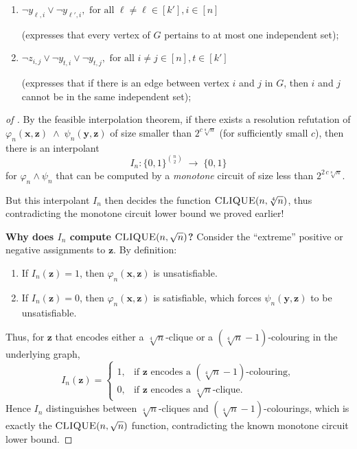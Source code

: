 \begin{definition}
\begin{enumerate}
\item  $\neg y_{\ell,i}\lor \neg y_{\ell',i}, \mbox{ for all } \ell\ne\ell\in[k'], i\in[n]$

(expresses that every vertex of $G$ pertains to at most one independent set);
\label{eq-clique-holes-r}%

\item $\neg z_{i,j}\lor \neg y_{t,i}\lor \neg y_{t,j}, \mbox{ for all } i\ne j\in[n],
t\in[k']$

(expresses that if there is an edge between vertex $i$ and $j$ in $G$, then
$i$ and $j$ cannot be in the same independent set);
\label{eq-clique-final-contradictory-clauses}
\end{enumerate}
\renewcommand{\theenumi}{(\Roman{enumi})}   %
\end{definition}



\begin{proof}[of ]
By the feasible interpolation theorem, if there exists a resolution refutation of 
\(\varphi_n(\mathbf{x},\mathbf{z}) \;\wedge\; \psi_n(\mathbf{y},\mathbf{z})\)
of size smaller than \(2^{c\sqrt[8]{n}}\) (for sufficiently small \(c\)), then there is an interpolant 
\[
I_n : \{0,1\}^{n \choose 2} \;\longrightarrow\; \{0,1\}
\]
for \(\varphi_n \wedge \psi_n\) that can be computed by a \emph{monotone} circuit of size less than \(2^{2\,c\sqrt[8]{n}}\).

But this interpolant \(I_n\) then decides the function 
\(\textsc{CLIQUE}(n,\sqrt[4]{n})\), thus contradicting the monotone circuit lower bound we proved earlier!

\medskip

\noindent
\textbf{Why does \(I_n\) compute \(\textsc{CLIQUE}(n,\sqrt{n})\)?}
Consider the ``extreme'' positive or negative assignments to \(\mathbf{z}\). By definition:
\begin{enumerate}[label=\textbf{(\alph*)}]
    \item If \(I_n(\mathbf{z}) = 1\), then \(\varphi_n(\mathbf{x},\mathbf{z})\) is unsatisfiable.
    \item If \(I_n(\mathbf{z}) = 0\), then \(\varphi_n(\mathbf{x},\mathbf{z})\) is satisfiable, which forces \(\psi_n(\mathbf{y},\mathbf{z})\) to be unsatisfiable.
\end{enumerate}

Thus, for \(\mathbf{z}\) that encodes either a \(\sqrt[4]{n}\)-clique or a \((\sqrt[4]{n}-1)\)-colouring in the underlying graph,
\[
I_n(\mathbf{z}) = 
\begin{cases}
1, & \text{if }\mathbf{z}\text{ encodes a }(\sqrt[4]{n}-1)\text{-colouring},\\
0, & \text{if }\mathbf{z}\text{ encodes a }\sqrt[4]{n}\text{-clique}.
\end{cases}
\]
Hence \(I_n\) distinguishes between \(\sqrt[4]{n}\)-cliques and \((\sqrt[4]{n}-1)\)-colourings, which is exactly the \(\textsc{CLIQUE}(n,\sqrt{n})\) function, contradicting the known monotone circuit lower bound. 
\end{proof}

